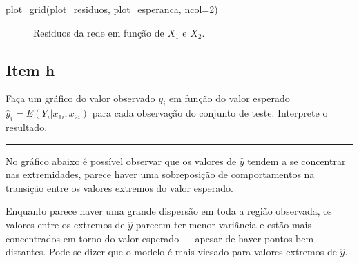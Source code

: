 \documentclass[
  a4paperpaper,
]{article}
\newenvironment{Shaded}{\begin{snugshade}}{\end{snugshade}}
\newcommand{\AttributeTok}[1]{\textcolor[rgb]{0.40,0.45,0.13}{#1}}
\newcommand{\DecValTok}[1]{\textcolor[rgb]{0.68,0.00,0.00}{#1}}
\newcommand{\FunctionTok}[1]{\textcolor[rgb]{0.28,0.35,0.67}{#1}}
\newcommand{\NormalTok}[1]{\textcolor[rgb]{0.00,0.23,0.31}{#1}}
\begin{document}
\begin{Shaded}
\begin{Highlighting}[]
\FunctionTok{plot\_grid}\NormalTok{(plot\_residuos, plot\_esperanca, }\AttributeTok{ncol=}\DecValTok{2}\NormalTok{)}
\end{Highlighting}
\end{Shaded}

\begin{figure}[H]


\caption{\label{fig-predicao-residuos}Resíduos da rede em função de
\(X_1\) e \(X_2\).}

\end{figure}%

\subsection{Item h}\label{item-h}

Faça um gráfico do valor observado \(y_i\) em função do valor esperado
\(\hat{y}_i = E(Y_i |x_{1i} , x_{2i})\) para cada observação do conjunto
de teste. Interprete o resultado.

\begin{center}\rule{0.5\linewidth}{0.5pt}\end{center}

No gráfico abaixo é possível observar que os valores de \(\hat{y}\)
tendem a se concentrar nas extremidades, parece haver uma sobreposição
de comportamentos na transição entre os valores extremos do valor
esperado.

Enquanto parece haver uma grande dispersão em toda a região observada,
os valores entre os extremos de \(\hat{y}\) parecem ter menor variância
e estão mais concentrados em torno do valor esperado --- apesar de haver
pontos bem distantes. Pode-se dizer que o modelo é mais viesado para
valores extremos de \(\hat{y}\).
\end{document}

